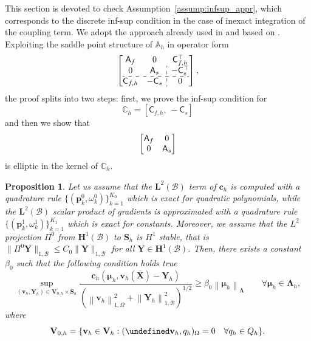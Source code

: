 \documentclass[oneside]{amsart} %
\newcommand{\numberset}{\mathbb}
\newcommand{\A}{\numberset{A}}
\newcommand{\C}{\numberset{C}}
\newcommand{\norm}[1]{\left\lVert#1\right\rVert}
\newtheorem{prop}{Proposition}
\let\div\undefined\DeclareMathOperator{\div}{div} %
\newcommand\Hub{\mathbf{H}^1(\B)} %
\newcommand\LdBd{\mathbf{L}^2(\B)} %
\newcommand\B{\mathcal B} %
\renewcommand\v{\mathbf{v}} %
\renewcommand\c{\mathbf{c}} %
\renewcommand\S{\mathbf{S}} %
\newcommand\X{\mathbf{X}} %
\newcommand\Xbar{\overline{\X}} %
\newcommand\Y{\mathbf{Y}} %
\newcommand\LL{{\boldsymbol{\Lambda}}} %
\newcommand\Vline{\mathbf{V}} %
\newcommand\Sline{\S} %
\newcommand\mmu{{\boldsymbol\mu}} %
\newcommand\quadnode{\mathbf{p}}
\newcommand\quadweigth{\omega}
\newcommand\Vdiv{\Vline_{0,h}} %
\newcommand\projLdue{\Pi^0} %
\newcommand{\Amatr}{\mathsf{A}}
\newcommand{\Cmatr}{\mathsf{C}}
\begin{document}
	This section is devoted to check Assumption~\ref{assump:infsup_appr}, which
	corresponds to the discrete inf-sup condition in the case of inexact integration of the coupling term. We adopt the approach already used in \cite{stat} and based on \cite{xu2003some}. Exploiting the saddle point structure of $\A_h$ in operator form
	\begin{equation*}
		\left[\begin{array}{@{}cc:c@{}}
			\Amatr_f & 0 & \Cmatr_{f,h}^\top\\
			0 & \Amatr_s & -\Cmatr_s^\top \\
			\hdashline
			\Cmatr_{f,h} & -\Cmatr_s & 0
		\end{array}\right],
	\end{equation*}
	the proof splits into two steps: first, we prove the inf-sup condition for
	\begin{equation*}
		\C_h = [\Cmatr_{f,h},\,-\Cmatr_s]
	\end{equation*}
	and then we show that
	\begin{equation*}
		\left[\begin{array}{@{}cc@{}}
			\Amatr_f & 0\\
			0 & \Amatr_s
		\end{array}\right]
	\end{equation*}
	is elliptic in the kernel of $\C_h$.
	
	\begin{prop}\label{prop:infsupch}
		Let us assume that the $\LdBd$ term of $\c_h$ is computed with a quadrature rule $\{(\quadnode_k^0,\quadweigth_k^0)\}_{k=1}^{K_0}$ which is exact for quadratic polynomials, while the $\LdBd$ scalar product of gradients is approximated with a quadrature rule $\{(\quadnode_k^1,\quadweigth_k^1)\}_{k=1}^{K_1}$ which is exact for constants. Moreover, we assume that the $L^2$ projection $\projLdue$ from $\Hub$ to $\Sline_h$ is $H^1$ stable, that is $\|\projLdue\Y\|_{1,\B}\le C_0 \|\Y\|_{1,\B}$ for all $\Y\in\Hub$. Then, there exists a constant $\beta_0$ such that the following condition holds true
		\begin{equation}
			\sup_{(\v_h,\Y_h)\in\Vdiv \times \Sline_h} \frac{\c_h(\mmu_h,\v_h(\Xbar)-\Y_h)}{(\norm{\v_h}^2_{1,\Omega} + \norm{\Y_h}^2_{1,\B})^{1/2}} \ge \beta_0 \norm{\mmu_h}_{\LL}\qquad\forall\mmu_h\in\LL_h,
		\end{equation}
		where 
		\begin{equation*}
			\Vdiv = \{\v_h\in\Vline_h:(\div\v_h,q_h)_\Omega=0\quad\forall q_h\in Q_h\}.
		\end{equation*}
	\end{prop}
	
\end{document}
